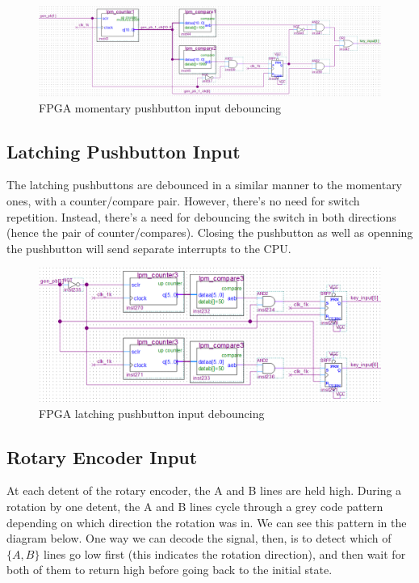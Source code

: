 \begin{figure}[ht!]
    \centering
    \includegraphics[width=6in]{fpga_logic/keys_pb.png}
		\caption{FPGA momentary pushbutton input debouncing}
\end{figure}

\subsection{Latching Pushbutton Input}

The latching pushbuttons are debounced in a similar manner to the momentary ones, with a counter/compare pair. However, there's no need for switch repetition. Instead, there's a need for debouncing the switch in both directions (hence the pair of counter/compares). Closing the pushbutton as well as openning the pushbutton will send separate interrupts to the CPU.

\begin{figure}[ht!]
    \centering
    \includegraphics[width=6in]{fpga_logic/keys_pb_latching.png}
		\caption{FPGA latching pushbutton input debouncing}
\end{figure}

\subsection{Rotary Encoder Input}

At each detent of the rotary encoder, the A and B lines are held high. During a rotation by one detent, the A and B lines cycle through a grey code pattern depending on which direction the rotation was in. We can see this pattern in the diagram below. One way we can decode the signal, then, is to detect which of $\{A,B\}$ lines go low first (this indicates the rotation direction), and then wait for both of them to return high before going back to the initial state.

